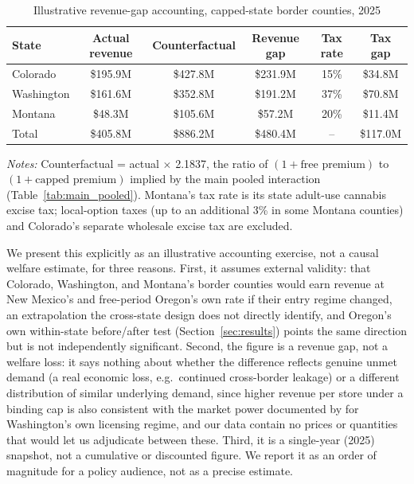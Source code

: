 \documentclass[12pt]{article}
\begin{document}
\begin{table}[htbp]
\centering
\caption{Illustrative revenue-gap accounting, capped-state border counties, 2025}
\label{tab:magnitude}
\small
\begin{tabular}{lccccc}
\toprule
State & Actual revenue & Counterfactual & Revenue gap & Tax rate & Tax gap \\
\midrule
Colorado & \$195.9M & \$427.8M & \$231.9M & 15\% & \$34.8M \\
Washington & \$161.6M & \$352.8M & \$191.2M & 37\% & \$70.8M \\
Montana & \$48.3M & \$105.6M & \$57.2M & 20\% & \$11.4M \\
\midrule
Total & \$405.8M & \$886.2M & \$480.4M & -- & \$117.0M \\
\bottomrule
\end{tabular}
\begin{minipage}{0.9\textwidth}
\vspace{0.3em}
\footnotesize
\textit{Notes:} Counterfactual = actual $\times$ 2.1837, the ratio of $(1+\text{free premium})$ to
$(1+\text{capped premium})$ implied by the main pooled interaction (Table~\ref{tab:main_pooled}). Montana's
tax rate is its state adult-use cannabis excise tax; local-option taxes (up to an additional 3\% in some
Montana counties) and Colorado's separate wholesale excise tax are excluded.
\end{minipage}
\end{table}

We present this explicitly as an illustrative accounting exercise, not a causal welfare estimate, for three
reasons. First, it assumes external validity: that Colorado, Washington, and Montana's border counties would
earn revenue at New Mexico's and free-period Oregon's own rate if their entry regime changed, an extrapolation
the cross-state design does not directly identify, and Oregon's own within-state before/after test
(Section~\ref{sec:results}) points the same direction but is not independently significant. Second, the figure
is a revenue gap, not a welfare loss: it says nothing about whether the difference reflects genuine unmet
demand (a real economic loss, e.g.\ continued cross-border leakage) or a different distribution of similar
underlying demand, since higher revenue per store under a binding cap is also consistent with the market
power documented by \citet{HollenbeckUetake2021} for Washington's own licensing regime, and our data contain
no prices or quantities that would let us adjudicate between these. Third, it is a single-year (2025) snapshot,
not a cumulative or discounted figure. We report it as an order of magnitude for a policy audience, not as a
precise estimate.
\end{document}
